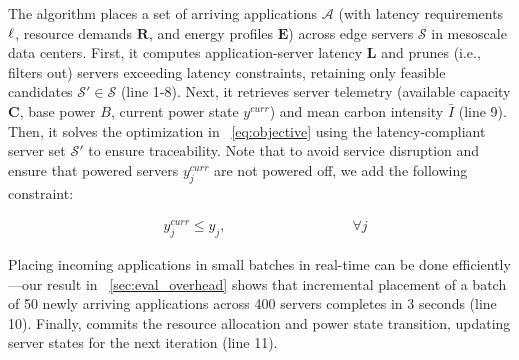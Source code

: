 The algorithm places a set of arriving applications $\mathcal{A}$ (with latency requirements $\boldmath\ell$, resource demands $\mathbf{R}$, and energy profiles $\mathbf{E}$) across edge servers $\mathcal{S}$ in mesoscale data centers. First, it computes application-server latency $\mathbf{L}$ and prunes (i.e., filters out) servers exceeding latency constraints, retaining only feasible candidates $\mathcal{S}' \in \mathcal{S}$ (line 1-8). Next, it retrieves server telemetry (available capacity $\mathbf{C}$, base power $B$, current power state $y^{curr}$) and  mean carbon intensity $\bar{I}$ (line 9). Then, it solves the optimization in ~\autoref{eq:objective} using the latency-compliant server set $\mathcal{S}'$ to ensure traceability. Note that to avoid service disruption and ensure that powered servers $y_j^{curr}$ are not powered off, we add the following constraint:

{\small 
\begin{align}
    \label{eq:server_keep_on}
    & y_j^{curr} \leq y_j, \quad \quad \quad \quad  \quad \quad \quad \quad \quad \forall j 
\end{align}
}

Placing incoming applications in small batches in real-time can be done efficiently---our result in ~\autoref{sec:eval_overhead} shows that incremental placement of a batch of 50 newly arriving applications across 400 servers completes in 3 seconds (line 10). Finally, \proposedsystem commits the resource allocation and power state transition, updating server states for the next iteration (line 11).







